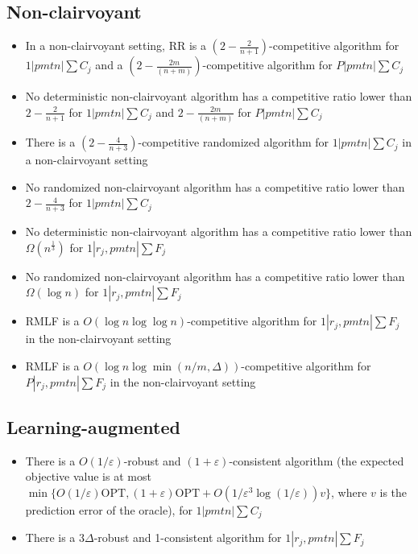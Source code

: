 \documentclass{article}
\begin{document}
\subsection{Non-clairvoyant}

\begin{itemize}
    \item In a non-clairvoyant setting, RR is a \((2-\frac{2}{n+1})\)-competitive algorithm for
    \(1|\mathit{pmtn}|\sum C_j\) and a \((2-\frac{2m}{(n+m)})\)-competitive algorithm for
    \(P|\mathit{pmtn}|\sum C_j\) \cite{motwani1994nonclairvoyant}
    \item No deterministic non-clairvoyant algorithm has a competitive ratio lower than
    \(2-\frac{2}{n+1}\) for \(1|\mathit{pmtn}|\sum C_j\) and \(2-\frac{2m}{(n+m)}\) for
    \(P|\mathit{pmtn}|\sum C_j\) \cite{motwani1994nonclairvoyant}
    \item There is a \((2-\frac{4}{n+3})\)-competitive randomized algorithm for
    \(1|\mathit{pmtn}|\sum C_j\) in a non-clairvoyant setting \cite{motwani1994nonclairvoyant}
    \item No randomized non-clairvoyant algorithm has a competitive ratio lower than
    \(2-\frac{4}{n+3}\) for \(1|\mathit{pmtn}|\sum C_j\) \cite{motwani1994nonclairvoyant}
    \item No deterministic non-clairvoyant algorithm has a competitive ratio lower than
    \(\Omega(n^{\frac{1}{3}})\) for \(1|r_j,\mathit{pmtn}|\sum F_j\)
    \cite{motwani1994nonclairvoyant}
    \item No randomized non-clairvoyant algorithm has a competitive ratio lower than \(\Omega(\log
    n)\) for \(1|r_j,\mathit{pmtn}|\sum F_j\)
    \cite{motwani1994nonclairvoyant}
    \item RMLF is a \(O(\log n\log\log n)\)-competitive algorithm for \(1|r_j,\mathit{pmtn}|\sum
    F_j\) in the non-clairvoyant setting \cite{kalyanasundaram2003minimizing}
    \item RMLF is a \(O(\log n\log\min(n/m,\Delta))\)-competitive algorithm for
    \(P|r_j,\mathit{pmtn}|\sum F_j\) in the non-clairvoyant setting
    \cite{becchetti2004nonclairvoyant}
\end{itemize}

\subsection{Learning-augmented}

\begin{itemize}
    \item There is a \(O(1/\varepsilon)\)-robust and \((1+\varepsilon)\)-consistent algorithm (the
    expected objective value is at most
    \(\min\{O(1/\varepsilon)\mathrm{OPT},(1+\varepsilon)\mathrm{OPT}+O(1/\varepsilon^3\log(1/\varepsilon))v\}\),
    where \(v\) is the prediction error of the oracle), for \(1|\mathit{pmtn}|\sum C_j\)
    \cite{im2023non}
    \item There is a \(3\Delta\)-robust and 1-consistent algorithm for \(1|r_j,\mathit{pmtn}|\sum
    F_j\) \cite{zhao2022brief}
\end{itemize}
\end{document}
